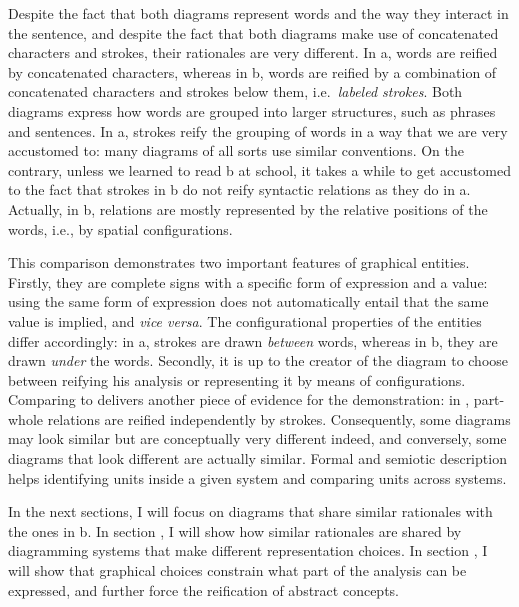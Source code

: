 \documentclass[english,output=paper,colorlinks,citecolor=brown]{../langscibook}
\begin{document}
Despite the fact that both diagrams represent words and the way they interact in the sentence, and despite the fact that both diagrams make use of concatenated characters and strokes, their rationales are very different. In a, words are reified by concatenated characters, whereas in b, words are reified by a combination of concatenated characters and strokes below them, i.e.~\textit{labeled strokes}. Both diagrams express how words are grouped into larger structures, such as phrases and sentences. In a, strokes reify the grouping of words in a way that we are very accustomed to: many diagrams of all sorts use similar conventions. On the contrary, unless we learned to read b at school, it takes a while to get accustomed to the fact that strokes in b do not reify syntactic relations as they do in a. Actually, in b, relations are mostly represented by the relative positions of the words, i.e., by spatial configurations.

This comparison demonstrates two important features of graphical entities. Firstly, they are complete signs with a specific form of expression and a value: using the same form of expression does not automatically entail that the same value is implied, and \textit{vice versa}. The configurational properties of the entities differ accordingly: in a, strokes are drawn \textit{between} words, whereas in b, they are drawn \textit{under} the words. Secondly, it is up to the creator of the diagram to choose between reifying his analysis or representing it by means of configurations. Comparing  to  delivers another piece of evidence for the demonstration: in , part-whole relations are reified independently by strokes. Consequently, some diagrams may look similar but are conceptually very different indeed, and conversely, some diagrams that look different are actually similar. Formal and semiotic description helps identifying units inside a given system and comparing units across systems. 

In the next sections, I will focus on diagrams that share similar rationales with the ones in b. In section , I will show how similar rationales are shared by dia\-gramming systems that make different representation choices. In section , I will show that graphical choices constrain what part of the analysis can be expressed, and further force the reification of abstract concepts.
\end{document}
